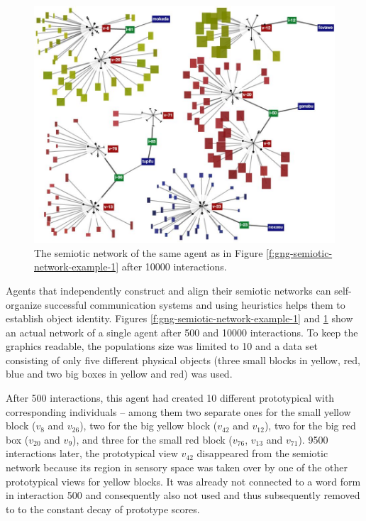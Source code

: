 \begin{figure}[t]
  \centerline{\includegraphics[width=1\textwidth]{figures/gng-semiotic-network-example-2}}
  \caption{The semiotic network of the same agent as in Figure
    \ref{f:gng-semiotic-network-example-1} after 10000 interactions.}
  \label{f:gng-semiotic-network-example-2}
\end{figure}

Agents that independently construct and align their semiotic networks
can self-organize successful communication systems and using
heuristics helps them to establish object identity. Figures
\ref{f:gng-semiotic-network-example-1} and
\ref{f:gng-semiotic-network-example-2} show an actual network of a
single agent after 500 and 10000 interactions. To keep the graphics
readable, the populations size was limited to 10 and a data set
consisting of only five different physical objects (three small blocks
in yellow, red, blue and two big boxes in yellow and red) was
used. 

After 500 interactions, this agent had created 10 different
prototypical with corresponding individuals -- among them two separate
ones for the small yellow block ($v_8$ and $v_{26}$), two for the big
yellow block ($v_{42}$ and $v_{12}$), two for the big red box
($v_{20}$ and $v_9$), and three for the small red block ($v_{76}$,
$v_{13}$ and $v_{71}$). 9500 interactions later, the prototypical view
$v_{42}$ disappeared from the semiotic network because its region in
sensory space was taken over by one of the other prototypical views
for yellow blocks. It was already not connected to a word form in
interaction 500 and consequently also not used and thus subsequently
removed to to the constant decay of prototype scores.

